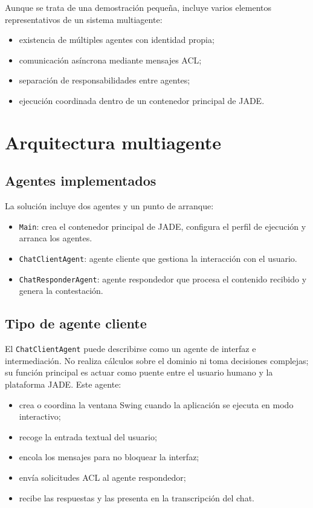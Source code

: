 \documentclass[12pt]{article}
\begin{document}
Aunque se trata de una demostración pequeña, incluye varios elementos representativos de un sistema multiagente:

\begin{itemize}[leftmargin=*]
  \item existencia de múltiples agentes con identidad propia;
  \item comunicación asíncrona mediante mensajes ACL;
  \item separación de responsabilidades entre agentes;
  \item ejecución coordinada dentro de un contenedor principal de JADE.
\end{itemize}

\section{Arquitectura multiagente}
\subsection{Agentes implementados}
La solución incluye dos agentes y un punto de arranque:

\begin{itemize}[leftmargin=*]
  \item \texttt{Main}: crea el contenedor principal de JADE, configura el perfil de ejecución y arranca los agentes.
  \item \texttt{ChatClientAgent}: agente cliente que gestiona la interacción con el usuario.
  \item \texttt{ChatResponderAgent}: agente respondedor que procesa el contenido recibido y genera la contestación.
\end{itemize}

\subsection{Tipo de agente cliente}
El \texttt{ChatClientAgent} puede describirse como un agente de interfaz e intermediación. No realiza cálculos sobre el dominio ni toma decisiones complejas; su función principal es actuar como puente entre el usuario humano y la plataforma JADE. Este agente:

\begin{itemize}[leftmargin=*]
  \item crea o coordina la ventana Swing cuando la aplicación se ejecuta en modo interactivo;
  \item recoge la entrada textual del usuario;
  \item encola los mensajes para no bloquear la interfaz;
  \item envía solicitudes ACL al agente respondedor;
  \item recibe las respuestas y las presenta en la transcripción del chat.
\end{itemize}
\end{document}
